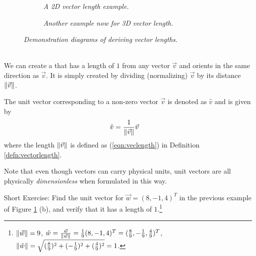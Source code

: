 \begin{figure}[h!]
\centering
\begin{subfigure}{0.7\textwidth}
\centering
{}
\caption{\textit{A 2D vector length example.}}
\end{subfigure}
\begin{subfigure}{0.7\textwidth}
\centering
{}
\caption{\textit{Another example now for 3D vector length.}}
\end{subfigure}
\caption{\textit{Demonstration diagrams of deriving vector lengths.}}
\label{fig:veclength}
\end{figure}\\
We can create a  that has a length of $1$ from any vector $\vec{v}$ and orients in the same direction as $\vec{v}$. It is simply created by dividing (normalizing) $\vec{v}$ by its distance $\norm{\vec{v}}$.
\begin{defn}
\label{defn:unitvec}
The unit vector corresponding to a non-zero vector $\vec{v}$ is denoted as $\hat{v}$ and is given by
\begin{align}
\hat{v} &= \frac{1}{\norm{\vec{v}}}\vec{v}
\end{align}
where the length $\norm{\vec{v}}$ is defined as (\ref{eqn:veclength}) in Definition \ref{defn:vectorlength}. 
\end{defn}
Note that even though vectors can carry physical units, unit vectors are all physically \textit{dimensionless} when formulated in this way. \par
Short Exercise: Find the unit vector for $\vec{w} = (8, -1, 4)^T$ in the previous example of Figure \ref{fig:veclength} (b), and verify that it has a length of $1$.\footnote{$\norm{\vec{w}} = 9$, $\hat{w} = \frac{\vec{w}}{\norm{\vec{w}}} = \frac{1}{9}(8,-1,4)^T = (\frac{8}{9}, -\frac{1}{9}, \frac{4}{9})^T$, $\norm{\hat{w}} = \sqrt{(\frac{8}{9})^2 + (-\frac{1}{9})^2 + (\frac{4}{9})^2} = 1$.}

